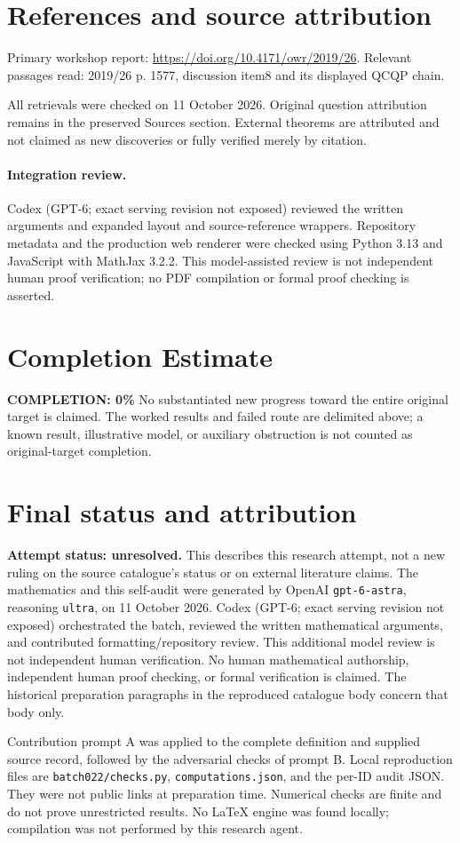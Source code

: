 \documentclass[11pt]{article}
\begin{document}
\section{References and source attribution}
Primary workshop report: \url{https://doi.org/10.4171/owr/2019/26}. Relevant passages read: 2019/26 p. 1577, discussion item8 and its displayed QCQP chain.

All retrievals were checked on 11 October 2026. Original question attribution remains in the preserved Sources section. External theorems are attributed and not claimed as new discoveries or fully verified merely by citation.


\paragraph{Integration review.} Codex (GPT-6; exact serving revision not exposed) reviewed the written arguments and expanded layout and source-reference wrappers. Repository metadata and the production web renderer were checked using Python 3.13 and JavaScript with MathJax 3.2.2. This model-assisted review is not independent human proof verification; no PDF compilation or formal proof checking is asserted.

\section{Completion Estimate}
\noindent\textbf{COMPLETION: 0\%}
No substantiated new progress toward the entire original target is claimed. The worked results and failed route are delimited above; a known result, illustrative model, or auxiliary obstruction is not counted as original-target completion.

\section{Final status and attribution}
\textbf{Attempt status: unresolved.} This describes this research attempt, not a new ruling on the source catalogue's status or on external literature claims.
The mathematics and this self-audit were generated by OpenAI \texttt{gpt-6-astra}, reasoning \texttt{ultra}, on 11 October 2026. Codex (GPT-6; exact serving revision not exposed) orchestrated the batch, reviewed the written mathematical arguments, and contributed formatting/repository review. This additional model review is not independent human verification. No human mathematical authorship, independent human proof checking, or formal verification is claimed. The historical preparation paragraphs in the reproduced catalogue body concern that body only.

Contribution prompt A was applied to the complete definition and supplied source record, followed by the adversarial checks of prompt B. Local reproduction files are \texttt{batch022/checks.py}, \texttt{computations.json}, and the per-ID audit JSON. They were not public links at preparation time. Numerical checks are finite and do not prove unrestricted results. No LaTeX engine was found locally; compilation was not performed by this research agent.
\end{document}
